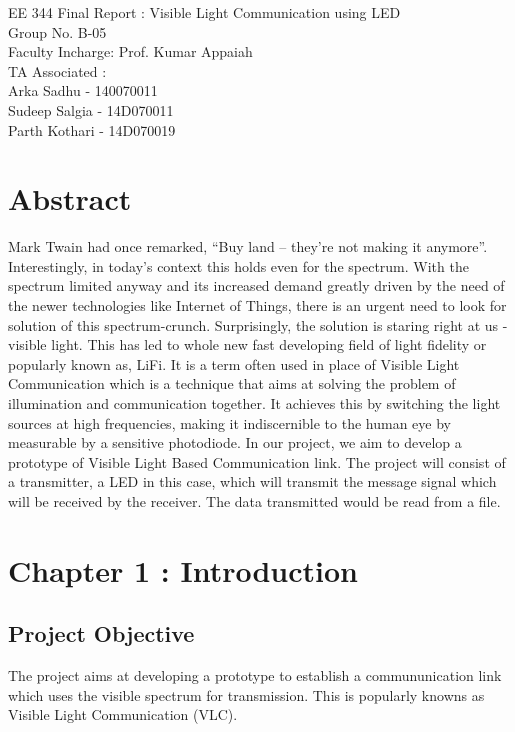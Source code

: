 \documentclass{article}
\begin{document}

EE 344 Final Report : Visible Light Communication using LED\\
Group No. B-05\\
Faculty Incharge: Prof. Kumar Appaiah\\
TA Associated : \\
Arka Sadhu - 140070011\\
Sudeep Salgia - 14D070011\\
Parth Kothari - 14D070019\\

\section{Abstract}
Mark Twain had once remarked, “Buy land -- they’re not making it anymore”. Interestingly, in today’s context this holds even for the spectrum. With the spectrum limited anyway and its increased demand greatly driven by the need of the newer technologies like Internet of Things, there is an urgent need to look for solution of this spectrum-crunch. Surprisingly, the solution is staring right at us - visible light. This has led to whole new fast developing field of light fidelity or popularly known as, LiFi. It is a term often used in place of Visible Light Communication which is a technique that aims at solving the problem of illumination and communication together. It achieves this by switching the light sources at high frequencies, making it indiscernible to the human eye by measurable by a sensitive photodiode.
In our project, we aim to develop a prototype of Visible Light Based Communication link. The
project will consist of a transmitter, a LED in this case, which will transmit the message signal
which will be received by the receiver. The data transmitted would be read from a file.
\newpage
\tableofcontents

\section{Chapter 1 : Introduction}
\subsection{Project Objective}
The project aims at developing a prototype to establish a commununication link which uses the visible spectrum for transmission. This is popularly knowns as Visible Light Communication (VLC).  
\end{document}
